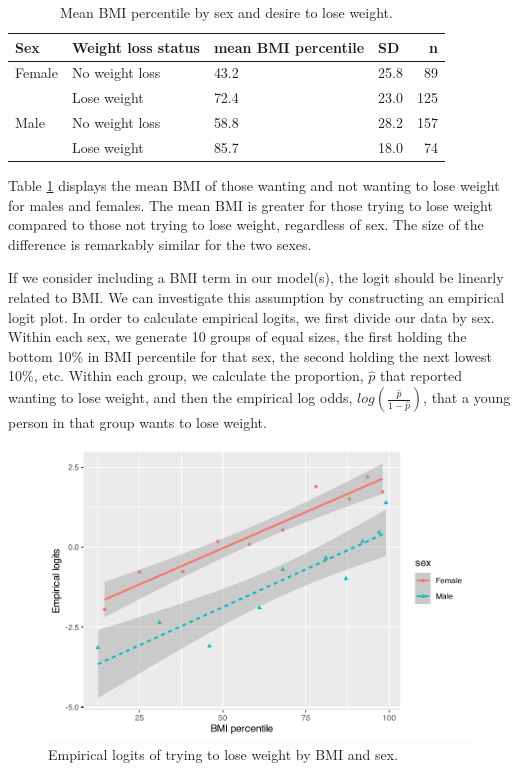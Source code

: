 \documentclass[
]{krantz}
\begin{document}
\begin{table}

\caption{\label{tab:table3chp6}Mean BMI percentile by sex and desire to lose weight.}
\centering
\begin{tabular}[t]{llllr}
\toprule
Sex & Weight loss status & mean BMI percentile & SD & n\\
\midrule
Female & No weight loss & 43.2 & 25.8 & 89\\
 & Lose weight & 72.4 & 23.0 & 125\\
Male & No weight loss & 58.8 & 28.2 & 157\\
 & Lose weight & 85.7 & 18.0 & 74\\
\bottomrule
\end{tabular}
\end{table}

Table \ref{tab:table3chp6} displays the mean BMI of those wanting and not wanting to lose weight for males and females. The mean BMI is greater for those trying to lose weight compared to those not trying to lose weight, regardless of sex. The size of the difference is remarkably similar for the two sexes.

If we consider including a BMI term in our model(s), the logit should be linearly related to BMI. We can investigate this assumption by constructing an empirical logit plot. In order to calculate empirical logits, we first divide our data by sex. Within each sex, we generate 10 groups of equal sizes, the first holding the bottom 10\% in BMI percentile for that sex, the second holding the next lowest 10\%, etc. Within each group, we calculate the proportion, \(\hat{p}\) that reported wanting to lose weight, and then the empirical log odds, \(log(\frac{\hat{p}}{1-\hat{p}})\), that a young person in that group wants to lose weight.

\begin{figure}

{\centering \includegraphics[width=0.6\linewidth]{bookdown-BeyondMLR_files/figure-latex/logitBMIsex-1} 

}

\caption{Empirical logits of trying to lose weight by BMI and sex.}\label{fig:logitBMIsex}
\end{figure}
\end{document}
